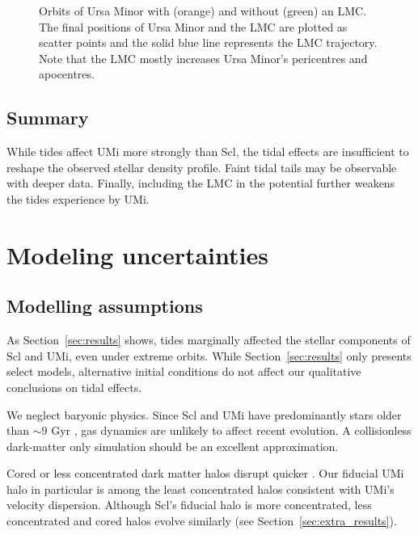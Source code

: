 \begin{figure}
\centering
{}
\caption[Ursa Minor orbits with LMC]{Orbits of Ursa Minor with (orange)
and without (green) an LMC. The final positions of Ursa Minor and the
LMC are plotted as scatter points and the solid blue line represents the
LMC trajectory. Note that the LMC mostly increases Ursa Minor's
pericentres and apocentres.}\label{fig:umi_orbits_lmc}
\end{figure}

\subsection{Summary}\label{summary-1}

While tides affect UMi more strongly than Scl, the tidal effects are
insufficient to reshape the observed stellar density profile. Faint
tidal tails may be observable with deeper data. Finally, including the
LMC in the potential further weakens the tides experience by UMi.

\section{Modeling uncertainties}\label{modeling-uncertainties}

\subsection{Modelling assumptions}\label{modelling-assumptions}

As Section~\ref{sec:results} shows, tides marginally affected the
stellar components of Scl and UMi, even under extreme orbits. While
Section~\ref{sec:results} only presents select models, alternative
initial conditions do not affect our qualitative conclusions on tidal
effects.

We neglect baryonic physics. Since Scl and UMi have predominantly stars
older than \(\sim 9\) Gyr
\citep{carrera+2002, deboer+2011, weisz+2014, delosreyes+2022, sato+2025},
gas dynamics are unlikely to affect recent evolution. A collisionless
dark-matter only simulation should be an excellent approximation.

Cored or less concentrated dark matter halos disrupt quicker
\citep[e.g.,][]{stucker+2023}. Our fiducial UMi halo in particular is
among the least concentrated halos consistent with UMi's velocity
dispersion. Although Scl's fiducial halo is more concentrated, less
concentrated and cored halos evolve similarly (see
Section~\ref{sec:extra_results}).

